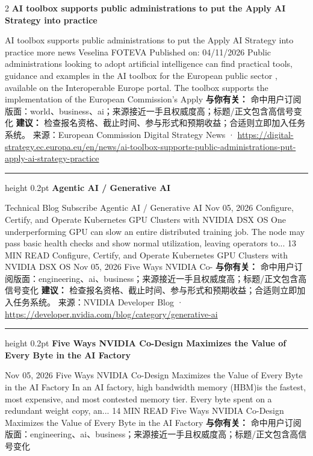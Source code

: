 \documentclass[10.5pt]{ctexart}
\begin{document}
\begin{multicols}{2}
{\large\bfseries AI toolbox supports public administrations to put the Apply AI Strategy into practice}\par
AI toolbox supports public administrations to put the Apply AI Strategy into practice more news Veselina FOTEVA Published on: 04/11/2026 Public administrations looking to adopt artificial intelligence can find practical tools, guidance and examples in the AI toolbox for the European public sector , available on the Interoperable Europe portal. The toolbox supports the implementation of the European Commission’s Apply
\textbf{与你有关：} 命中用户订阅版面：world、business、ai；来源接近一手且权威度高；标题/正文包含高信号变化
\textbf{建议：} 检查报名资格、截止时间、参与形式和预期收益；合适则立即加入任务系统。
{\footnotesize\color{ormuted} 来源：European Commission Digital Strategy News · \url{https://digital-strategy.ec.europa.eu/en/news/ai-toolbox-supports-public-administrations-put-apply-ai-strategy-practice}}
\vspace{2mm}
\hrule height 0.2pt
\vspace{2mm}
{\large\bfseries Agentic AI / Generative AI}\par
Technical Blog Subscribe Agentic AI / Generative AI Nov 05, 2026 Configure, Certify, and Operate Kubernetes GPU Clusters with NVIDIA DSX OS One underperforming GPU can slow an entire distributed training job. The node may pass basic health checks and show normal utilization, leaving operators to... 13 MIN READ Configure, Certify, and Operate Kubernetes GPU Clusters with NVIDIA DSX OS Nov 05, 2026 Five Ways NVIDIA Co-
\textbf{与你有关：} 命中用户订阅版面：engineering、ai、business；来源接近一手且权威度高；标题/正文包含高信号变化
\textbf{建议：} 检查报名资格、截止时间、参与形式和预期收益；合适则立即加入任务系统。
{\footnotesize\color{ormuted} 来源：NVIDIA Developer Blog · \url{https://developer.nvidia.com/blog/category/generative-ai}}
\vspace{2mm}
\hrule height 0.2pt
\vspace{2mm}
{\large\bfseries Five Ways NVIDIA Co-Design Maximizes the Value of Every Byte in the AI Factory}\par
Nov 05, 2026 Five Ways NVIDIA Co-Design Maximizes the Value of Every Byte in the AI Factory In an AI factory, high bandwidth memory (HBM)is the fastest, most expensive, and most contested memory tier. Every byte spent on a redundant weight copy, an... 14 MIN READ Five Ways NVIDIA Co-Design Maximizes the Value of Every Byte in the AI Factory
\textbf{与你有关：} 命中用户订阅版面：engineering、ai、business；来源接近一手且权威度高；标题/正文包含高信号变化

\end{multicols}
\end{document}
